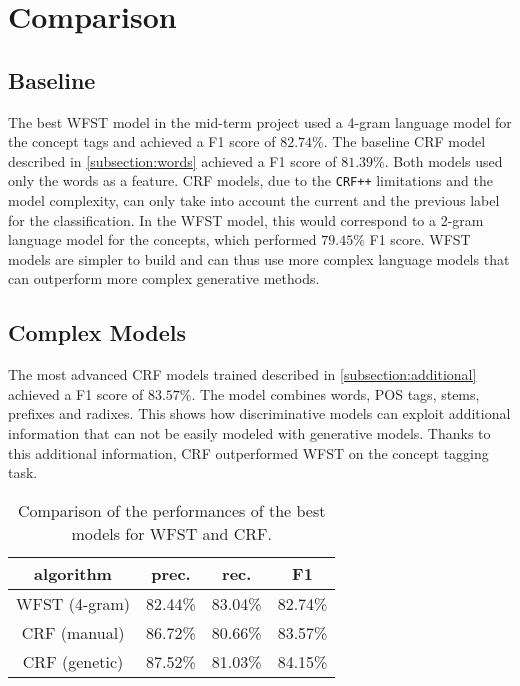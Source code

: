 \section{Comparison}
\label{sec:comparison}

\subsection{Baseline}
The best \ac{WFST} model in the mid-term project used a 4-gram language model for the concept tags and achieved a F1 score of $82.74\%$.
The baseline \ac{CRF} model described in \cref{subsection:words} achieved a F1 score of $81.39\%$.
Both models used only the words as a feature.
\ac{CRF} models, due to the \texttt{CRF++} limitations and the model complexity, can only take into account the current and the previous label for the classification.
In the \ac{WFST} model, this would correspond to a 2-gram language model for the concepts, which performed $79.45\%$ F1 score.
\ac{WFST} models are simpler to build and can thus use more complex language models that can outperform more complex generative methods.

\subsection{Complex Models}
The most advanced \ac{CRF} models trained described in \cref{subsection:additional} achieved a F1 score of $83.57\%$.
The model combines words, POS tags, stems, prefixes and radixes.
This shows how discriminative models can exploit additional information that can not be easily modeled with generative models.
Thanks to this additional information, \ac{CRF} outperformed \ac{WFST} on the concept tagging task.

\begin{table}[h]
	\centering
    \begin{tabular}{ c c c c }
    	\toprule
    		\multicolumn{1}{c}{algorithm} & \multicolumn{1}{c}{prec.} & \multicolumn{1}{c}{rec.} & \multicolumn{1}{c}{F1} \\
    	\midrule
            WFST (4-gram) & 82.44\% & 83.04\% & 82.74\% \\
            CRF (manual) & 86.72\% & 80.66\% & 83.57\% \\
			CRF (genetic) & 87.52\% & 81.03\% & 84.15\% \\
    	\bottomrule
	\end{tabular}
    \caption{Comparison of the performances of the best models for \ac{WFST} and \ac{CRF}.}
	\label{tab:best}
\end{table}

